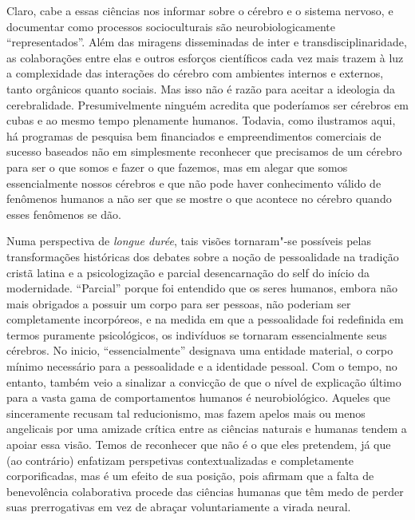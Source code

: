 Claro, cabe a essas ciências nos informar sobre o cérebro e o sistema
nervoso, e documentar como processos socioculturais são
neurobiologicamente ``representados''. Além das miragens disseminadas de
inter e transdisciplinaridade, as colaborações entre elas e outros
esforços científicos cada vez mais trazem à luz a complexidade das
interações do cérebro com ambientes internos e externos, tanto orgânicos
quanto sociais. Mas isso não é razão para aceitar a ideologia da
cerebralidade. Presumivelmente ninguém acredita que poderíamos ser
cérebros em cubas e ao mesmo tempo plenamente humanos. Todavia, como
ilustramos aqui, há programas de pesquisa bem financiados e
empreendimentos comerciais de sucesso baseados não em simplesmente
reconhecer que precisamos de um cérebro para ser o que somos e fazer o
que fazemos, mas em alegar que somos essencialmente nossos cérebros e
que não pode haver conhecimento válido de fenômenos humanos a não ser
que se mostre o que acontece no cérebro quando esses fenômenos se dão.

Numa perspectiva de \emph{longue durée}, tais visões tornaram"-se
possíveis pelas transformações históricas dos debates sobre a noção de
pessoalidade na tradição cristã latina e a psicologização e parcial
desencarnação do self do início da modernidade. ``Parcial'' porque foi
entendido que os seres humanos, embora não mais obrigados a possuir um
corpo para ser pessoas, não poderiam ser completamente incorpóreos, e na
medida em que a pessoalidade foi redefinida em termos puramente
psicológicos, os indivíduos se tornaram essencialmente seus cérebros. No
inicio, ``essencialmente'' designava uma entidade material, o corpo
mínimo necessário para a pessoalidade e a identidade pessoal. Com o
tempo, no entanto, também veio a sinalizar a convicção de que o nível de
explicação último para a vasta gama de comportamentos humanos é
neurobiológico. Aqueles que sinceramente recusam tal reducionismo, mas
fazem apelos mais ou menos angelicais por uma amizade crítica entre as
ciências naturais e humanas tendem a apoiar essa visão. Temos de
reconhecer que não é o que eles pretendem, já que (ao contrário)
enfatizam perspetivas contextualizadas e completamente corporificadas,
mas é um efeito de sua posição, pois afirmam que a falta de benevolência
colaborativa procede das ciências humanas que têm medo de perder suas
prerrogativas em vez de abraçar voluntariamente a virada neural.

